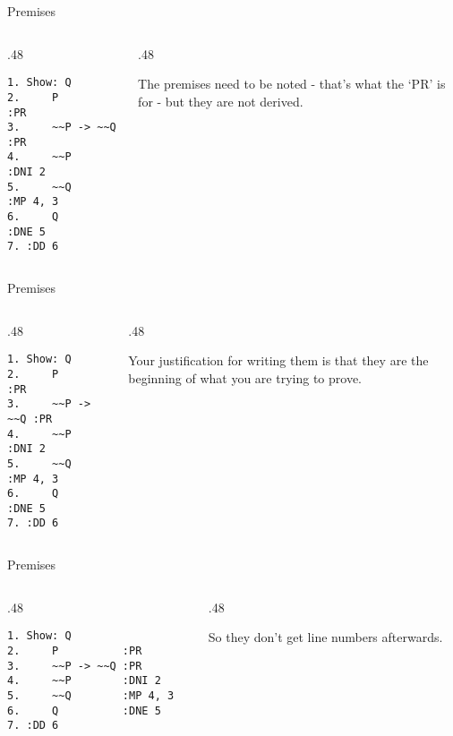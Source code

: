 \documentclass[
  ignorenonframetext,
]{beamer}
\renewcommand{\,}{\text{, }}
\def\begincols{\begin{columns}}
\def\begincol{\begin{column}}
\def\endcol{\end{column}}
\def\endcols{\end{columns}}
\begin{document}
\begin{frame}[fragile]{Premises}
\protect\hypertarget{premises-1}{}

\begincols
\begincol{.48\textwidth}

\begin{verbatim}
1. Show: Q
2.     P          :PR
3.     ~~P -> ~~Q :PR
4.     ~~P        :DNI 2
5.     ~~Q        :MP 4, 3
6.     Q          :DNE 5
7. :DD 6
\end{verbatim}

\endcol
\begincol{.48\textwidth}

The premises need to be noted - that's what the `PR' is for - but they
are not derived.

\endcol
\endcols

\end{frame}

\begin{frame}[fragile]{Premises}
\protect\hypertarget{premises-2}{}

\begincols
\begincol{.48\textwidth}

\begin{verbatim}
1. Show: Q
2.     P          :PR
3.     ~~P -> ~~Q :PR
4.     ~~P        :DNI 2
5.     ~~Q        :MP 4, 3
6.     Q          :DNE 5
7. :DD 6
\end{verbatim}

\endcol
\begincol{.48\textwidth}

Your justification for writing them is that they are the beginning of
what you are trying to prove.

\endcol
\endcols

\end{frame}

\begin{frame}[fragile]{Premises}
\protect\hypertarget{premises-3}{}

\begincols
\begincol{.48\textwidth}

\begin{verbatim}
1. Show: Q
2.     P          :PR
3.     ~~P -> ~~Q :PR
4.     ~~P        :DNI 2
5.     ~~Q        :MP 4, 3
6.     Q          :DNE 5
7. :DD 6
\end{verbatim}

\endcol
\begincol{.48\textwidth}

So they don't get line numbers afterwards.

\endcol
\endcols

\end{frame}
\end{document}
